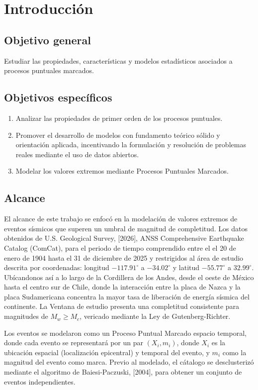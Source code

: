 \chapter{Introducción}


\section{Objetivo general}

Estudiar las propiedades, características y modelos estadísticos asociados a procesos puntuales marcados.
\section{Objetivos específicos}
\begin{enumerate}
    \item Analizar las propiedades de primer orden de los procesos puntuales.
    \item Promover el desarrollo de modelos con fundamento teórico sólido y orientación aplicada,
incentivando la formulación y resolución de problemas reales mediante el uso de datos abiertos.
    \item Modelar los valores extremos mediante Procesos Puntuales Marcados.
\end{enumerate}

\section{Alcance}

El alcance de este trabajo se enfocó en la modelación de valores extremos de eventos sísmicos que superen un umbral de magnitud de completitud. Los datos
obtenidos de U.S. Geological Survey, [2026], ANSS Comprehensive Earthquake Catalog (ComCat), para el periodo de tiempo comprendido entre el el 20 de enero de 1904 hasta el 31 de diciembre
de 2025 y restrigidos al área de estudio descrita por coordenadas: longitud $-117.91 ^{\circ}$ a $-34.02 ^{\circ}$ y latitud $-55.77 ^{\circ}$ a $32.99 ^{\circ}$. Ubícandonos así a lo largo
de la Cordillera de los Andes, desde el oeste de México hasta el centro sur de Chile, donde la interacción entre la placa de Nazca y la placa Sudamericana concentra la mayor tasa de 
liberación de energía sísmica del continente.
La Ventana de estudio presenta una completitud consistente para magnitudes de $M_w \geq M_c$, vericado mediante la Ley de Gutenberg-Richter.

Los eventos se modelaron como un Proceso Puntual Marcado espacio temporal, donde cada evento se representará por un par $(X_i, m_i)$, donde $X_i$ es la ubicación espacial (localización epicentral) y 
temporal del evento, y $m_i$ como la magnitud del evento como marca. Previo al modelado, el cátalogo se desclusterizó mediante el algoritmo de Baiesi-Paczuski, [2004], para obtener un conjunto de eventos independientes.

